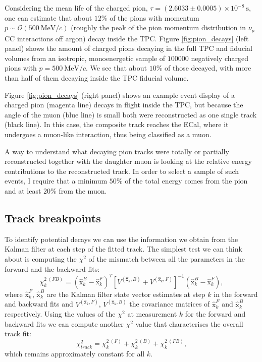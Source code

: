 Considering the mean life of the charged pion, $\tau = (2.6033\pm0.0005)\times10^{-8} \ \mathrm{s}$, one can estimate that about $12\%$ of the pions with momentum $p \sim \mathcal{O}(500 \ \mathrm{MeV}/c)$ (roughly the peak of the pion momentum distribution in $\nu_{\mu}$ CC interactions off argon) decay inside the TPC. Figure \ref{fig:pion_decays} (left panel) shows the amount of charged pions decaying in the full TPC and fiducial volumes from an isotropic, monoenergetic sample of $100000$ negatively charged pions with $p=500 \ \mathrm{MeV}/c$. We see that about $10\%$ of those decayed, with more than half of them decaying inside the TPC fiducial volume.

Figure \ref{fig:pion_decays} (right panel) shows an example event display of a charged pion (magenta line) decays in flight inside the TPC, but because the angle of the muon (blue line) is small both were reconstructed as one single track (black line). In this case, the composite track reaches the ECal, where it undergoes a muon-like interaction, thus being classified as a muon.

A way to understand what decaying pion tracks were totally or partially reconstructed together with the daughter muon is looking at the relative energy contributions to the reconstructed track. In order to select a sample of such events, I require that a minimum $50\%$ of the total energy comes from the pion and at least $20\%$ from the muon.

\subsection{Track breakpoints}

To identify potential decays we can use the information we obtain from the Kalman filter at each step of the fitted track. The simplest test we can think about is computing the $\chi^{2}$ of the mismatch between all the parameters in the forward and the backward fits:
\begin{equation}
	\chi^{2 \ (FB)}_{k} = (\hat{\mathrm{x}}^{B}_{k}-\hat{\mathrm{x}}^{F}_{k})^{T}[V^{(\hat{\mathrm{x}}_{k},B)}+V^{(\hat{\mathrm{x}}_{k},F)}]^{-1}(\hat{\mathrm{x}}^{B}_{k}-\hat{\mathrm{x}}^{F}_{k}),
\end{equation}
where $\hat{\mathrm{x}}^{F}_{k}$, $\hat{\mathrm{x}}^{B}_{k}$ are the Kalman filter state vector estimates at step $k$ in the forward and backward fits and $V^{(\hat{\mathrm{x}}_{k},F)}$, $V^{(\hat{\mathrm{x}}_{k},B)}$ the covariance matrices of $\hat{\mathrm{x}}^{F}_{k}$ and $\hat{\mathrm{x}}^{B}_{k}$ respectively. Using the values of the $\chi^{2}$ at measurement $k$ for the forward and backward fits we can compute another $\chi^{2}$ value that characterises the overall track fit:
\begin{equation}
	\chi^{2}_{track} = \chi^{2 \ (F)}_{k} + \chi^{2 \ (B)}_{k} + \chi^{2 \ (FB)}_{k},
\end{equation}
which remains approximately constant for all $k$.

